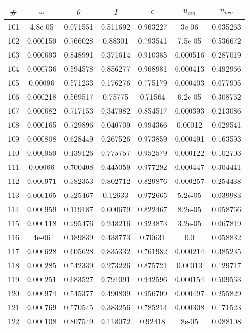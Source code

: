 \newpage
\begin{table}
\begin{tabular}{c|c|c|c|c|c|c}
\# & $\omega$ & $\theta$ & $I$ & $\epsilon$ & $u_{con}$ & $u_{pro}$\\
\hline
101 & 4.8e-05 & 0.071551 & 0.511692 & 0.963227 & 3e-06 & 0.035263\\
102 & 0.000159 & 0.766028 & 0.88301 & 0.793541 & 7.5e-05 & 0.536672\\
103 & 0.000693 & 0.848991 & 0.371614 & 0.910385 & 0.000516 & 0.287019\\
104 & 0.000736 & 0.594578 & 0.856277 & 0.968981 & 0.000413 & 0.492966\\
105 & 0.00096 & 0.571233 & 0.176276 & 0.775179 & 0.000403 & 0.077905\\
106 & 0.000218 & 0.569517 & 0.75775 & 0.71564 & 6.2e-05 & 0.308762\\
107 & 0.000682 & 0.717153 & 0.347982 & 0.854517 & 0.000393 & 0.213086\\
108 & 0.000165 & 0.729896 & 0.040709 & 0.994366 & 0.00012 & 0.029541\\
109 & 0.000808 & 0.628449 & 0.267526 & 0.973859 & 0.000491 & 0.163593\\
110 & 0.000959 & 0.139126 & 0.775757 & 0.952579 & 0.000122 & 0.102703\\
111 & 0.00066 & 0.700408 & 0.445059 & 0.977292 & 0.000447 & 0.304441\\
112 & 0.000971 & 0.382353 & 0.802712 & 0.829876 & 0.000257 & 0.254438\\
113 & 0.000165 & 0.325467 & 0.12633 & 0.972665 & 5.2e-05 & 0.039983\\
114 & 0.000959 & 0.119187 & 0.600679 & 0.822467 & 8.2e-05 & 0.058766\\
115 & 0.000118 & 0.295476 & 0.248216 & 0.924873 & 3.2e-05 & 0.067819\\
116 & 4e-06 & 0.189839 & 0.438773 & 0.70631 & 0.0 & 0.058832\\
117 & 0.000628 & 0.605628 & 0.835332 & 0.761982 & 0.000214 & 0.385235\\
118 & 0.000285 & 0.542339 & 0.273226 & 0.875721 & 0.00013 & 0.129717\\
119 & 0.000251 & 0.683527 & 0.791091 & 0.942596 & 0.000154 & 0.509563\\
120 & 0.000974 & 0.545377 & 0.490809 & 0.956709 & 0.000497 & 0.255829\\
121 & 0.000769 & 0.570545 & 0.383256 & 0.785214 & 0.000308 & 0.171523\\
122 & 0.000108 & 0.807549 & 0.118072 & 0.92418 & 8e-05 & 0.088108\\

\end{tabular}
\end{table}
